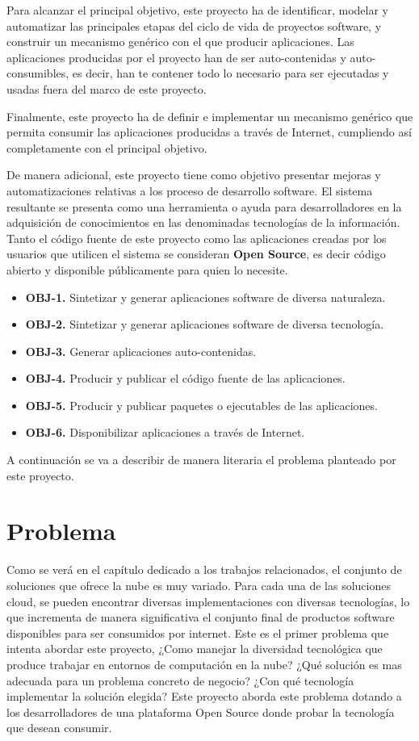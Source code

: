 \documentclass[a4paper,11pt]{book}
\begin{document}
Para alcanzar el principal objetivo, este proyecto ha de identificar, modelar y automatizar las principales etapas del ciclo de vida de proyectos software, y construir un mecanismo genérico con el que producir aplicaciones. Las aplicaciones producidas por el proyecto han de ser auto-contenidas y auto-consumibles, es decir, han te contener todo lo necesario para ser ejecutadas y usadas fuera del marco de este proyecto.

Finalmente, este proyecto ha de definir e implementar un mecanismo genérico que permita consumir las aplicaciones producidas a través de Internet, cumpliendo así completamente con el principal objetivo.


De manera adicional, este proyecto tiene como objetivo presentar mejoras y automatizaciones relativas a los proceso de desarrollo software. El sistema resultante se presenta como una herramienta o ayuda para desarrolladores en la adquisición de conocimientos  en las denominadas tecnologías de la información. Tanto el código fuente de este proyecto como las aplicaciones creadas por los usuarios que utilicen el sistema se consideran  \textbf{Open Source}, es decir código abierto y disponible públicamente para quien lo necesite.

\begin{itemize}
\item \textbf{OBJ-1. } Sintetizar y generar aplicaciones software de diversa naturaleza.
\item \textbf{OBJ-2. } Sintetizar y generar aplicaciones software de diversa tecnología.
\item \textbf{OBJ-3. } Generar aplicaciones auto-contenidas.
\item \textbf{OBJ-4. } Producir y publicar el código fuente de las aplicaciones.
\item \textbf{OBJ-5. } Producir y publicar paquetes o ejecutables de las aplicaciones.
\item \textbf{OBJ-6. } Disponibilizar aplicaciones a través de Internet.
\end{itemize}

A continuación se va a describir de manera literaria el problema planteado por este proyecto. 

\section{Problema}

Como se verá en el capítulo dedicado a los trabajos relacionados, el conjunto de soluciones que ofrece la nube es muy variado. Para cada una de las soluciones cloud, se pueden encontrar diversas implementaciones con diversas tecnologías, lo que incrementa
de manera significativa el conjunto final de productos software disponibles para ser consumidos por internet. Este es el primer problema que intenta abordar este proyecto, ¿Como manejar la diversidad tecnológica que produce trabajar en entornos de computación
en la nube? ¿Qué solución es mas adecuada para un problema concreto de negocio? ¿Con qué tecnología implementar la solución elegida? Este proyecto aborda este problema dotando a los desarrolladores de una plataforma Open Source donde probar la tecnología que desean consumir.  \\
\end{document}
